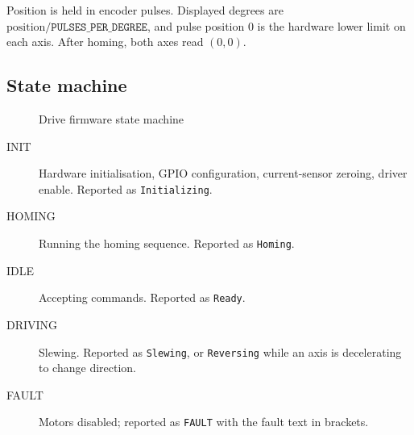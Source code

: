 \documentclass[11pt,a4paper]{article}
\begin{document}
Position is held in encoder pulses. Displayed degrees are $\text{position}/\texttt{PULSES\_PER\_DEGREE}$, and pulse position 0 is the hardware lower limit on each axis. After homing, both axes read $(0,0)$.

\subsection{State machine}

\begin{figure}[H]
\centering
{}
\caption{Drive firmware state machine}
\label{fig:state-machine}
\end{figure}

\begin{description}
    \item[INIT] Hardware initialisation, GPIO configuration, current-sensor zeroing, driver enable. Reported as \texttt{Initializing}.
    \item[HOMING] Running the homing sequence. Reported as \texttt{Homing}.
    \item[IDLE] Accepting commands. Reported as \texttt{Ready}.
    \item[DRIVING] Slewing. Reported as \texttt{Slewing}, or \texttt{Reversing} while an axis is decelerating to change direction.
    \item[FAULT] Motors disabled; reported as \texttt{FAULT} with the fault text in brackets.
\end{description}
\end{document}
